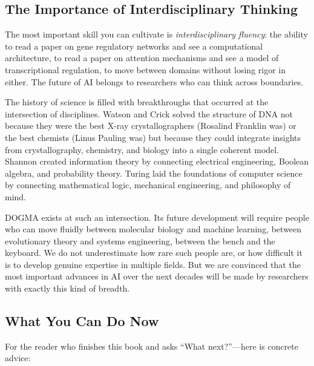 \subsection{The Importance of Interdisciplinary Thinking}

\begin{keyinsight}
The most important skill you can cultivate is \emph{interdisciplinary fluency}: the ability to read a paper on gene regulatory networks and see a computational architecture, to read a paper on attention mechanisms and see a model of transcriptional regulation, to move between domains without losing rigor in either. The future of AI belongs to researchers who can think across boundaries.
\end{keyinsight}

The history of science is filled with breakthroughs that occurred at the intersection of disciplines. Watson and Crick solved the structure of DNA not because they were the best X-ray crystallographers (Rosalind Franklin was) or the best chemists (Linus Pauling was) but because they could integrate insights from crystallography, chemistry, and biology into a single coherent model. Shannon created information theory by connecting electrical engineering, Boolean algebra, and probability theory. Turing laid the foundations of computer science by connecting mathematical logic, mechanical engineering, and philosophy of mind.

DOGMA exists at such an intersection. Its future development will require people who can move fluidly between molecular biology and machine learning, between evolutionary theory and systems engineering, between the bench and the keyboard. We do not underestimate how rare such people are, or how difficult it is to develop genuine expertise in multiple fields. But we are convinced that the most important advances in AI over the next decades will be made by researchers with exactly this kind of breadth.

\subsection{What You Can Do Now}

For the reader who finishes this book and asks ``What next?''---here is concrete advice:

